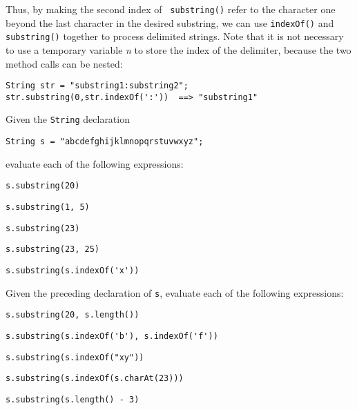 \noindent Thus, by making the second index of {\tt
substring()} refer to the character one beyond the last character in
the desired substring, we can use {\tt indexOf()} and {\tt
substring()} together to process delimited strings.  Note that it is
not necessary to use a temporary variable {\it n} to store the index
of the delimiter, because the two method calls can be nested:

\begin{jjjlisting}
\begin{lstlisting}
String str = "substring1:substring2";
str.substring(0,str.indexOf(':'))  ==> "substring1"
\end{lstlisting}
\end{jjjlisting}


\label{self-study-exercises}
\begin{SSTUDY}
\item  Given the {\tt String} declaration 

\begin{jjjlisting}
\begin{lstlisting}
String s = "abcdefghijklmnopqrstuvwxyz";
\end{lstlisting}
\end{jjjlisting}

\noindent evaluate each of the following expressions:

\begin{EXRLL}
\begin{multicols}{2}
\item  \verb|s.substring(20)|       
\item  \verb|s.substring(1, 5)|     
\item  \verb|s.substring(23)|       
\item  \verb|s.substring(23, 25)|   
\item  \verb|s.substring(s.indexOf('x'))|
\end{multicols}
\end{EXRLL}


\item  Given the preceding declaration of {\tt s}, evaluate each
of the following expressions:

\begin{EXRLL}
\item  \verb|s.substring(20, s.length())|                  
\item  \verb|s.substring(s.indexOf('b'), s.indexOf('f'))|  
\item  \verb|s.substring(s.indexOf("xy"))|                 
\item  \verb|s.substring(s.indexOf(s.charAt(23)))|         
\item  \verb|s.substring(s.length() - 3)|                  
\end{EXRLL}

\end{SSTUDY}



